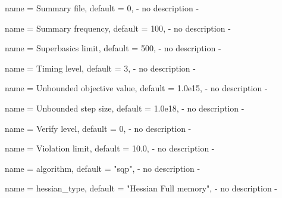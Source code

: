 \begin{parameter}{
    name    = {Summary file},
    default = {0},
}
- no description -
\end{parameter}

\begin{parameter}{
    name    = {Summary frequency},
    default = {100},
}
- no description -
\end{parameter}

\begin{parameter}{
    name    = {Superbasics limit},
    default = {500},
}
- no description -
\end{parameter}

\begin{parameter}{
    name    = {Timing level},
    default = {3},
}
- no description -
\end{parameter}

\begin{parameter}{
    name    = {Unbounded objective value},
    default = {1.0e15},
}
- no description -
\end{parameter}

\begin{parameter}{
    name    = {Unbounded step size},
    default = {1.0e18},
}
- no description -
\end{parameter}

\begin{parameter}{
    name    = {Verify level},
    default = {0},
}
- no description -
\end{parameter}

\begin{parameter}{
    name    = {Violation limit},
    default = {10.0},
}
- no description -
\end{parameter}

\begin{parameter}{
    name    = {algorithm},
    default = {"sqp"},
}
- no description -
\end{parameter}

\begin{parameter}{
    name    = {hessian_type},
    default = {"Hessian Full memory"},
}
- no description -
\end{parameter}

